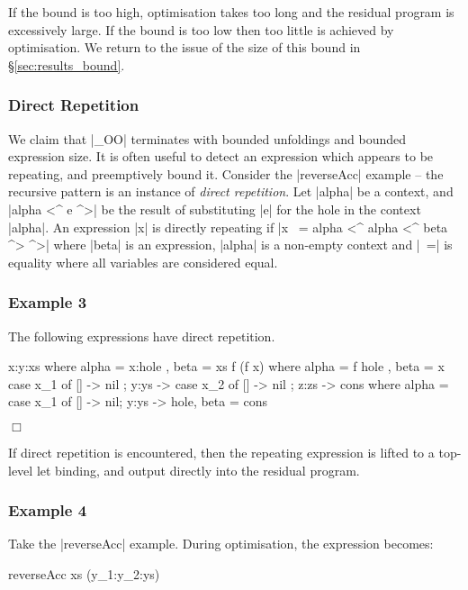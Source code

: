 \documentclass{llncs}
\newcommand{\noexample}{\hfill$\Box$}
\begin{document}
If the bound is too high, optimisation takes too long and the residual program is excessively large. If the bound is too low then too little is achieved by optimisation. We return to the issue of the size of this bound in \S\ref{sec:results_bound}.

\subsubsection{Direct Repetition}
\label{sec:direct}

We claim that |_OO| terminates with bounded unfoldings and bounded expression size. It is often useful to detect an expression which appears to be repeating, and preemptively bound it. Consider the |reverseAcc| example -- the recursive pattern is an instance of \textit{direct repetition}. Let |alpha| be a context, and |alpha <^ e ^>| be the result of substituting |e| for the hole in the context |alpha|. An expression |x| is directly repeating if |x ~= alpha <^ alpha <^ beta ^> ^>| where |beta| is an expression, |alpha| is a non-empty context and |~=| is equality where all variables are considered equal.

\subsubsection{Example 3} \hfill\vspace{2mm}

\noindent The following expressions have direct repetition.

\begin{code}
x:y:xs   where alpha = x:hole  , beta = xs
f (f x)  where alpha = f hole  , beta = x
case x_1 of {[] -> nil ; y:ys -> case x_2 of {[] -> nil ; z:zs -> cons}}
    where alpha = case x_1 of {[] -> nil; y:ys -> hole}, beta = cons
\end{code}
\noexample

If direct repetition is encountered, then the repeating expression is lifted to a top-level let binding, and output directly into the residual program.

\subsubsection{Example 4} \hfill\vspace{2mm}

\noindent Take the |reverseAcc| example. During optimisation, the expression becomes:

\begin{code}
reverseAcc xs (y_1:y_2:ys)
\end{code}
\end{document}
